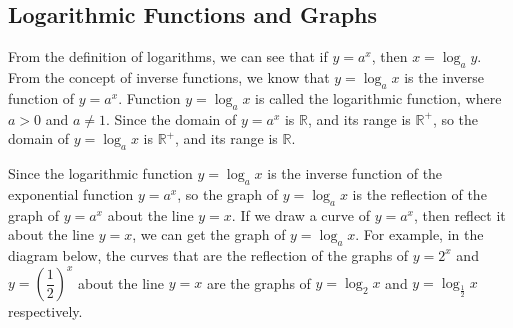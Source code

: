 \documentclass[12pt]{report}
\begin{document}
\subsection*{Logarithmic Functions and Graphs}

From the definition of logarithms, we can see that if $y = a^x$, then $x =
    \log_a y$. From the concept of inverse functions, we know that $y = \log_a x$
is the inverse function of $y = a^x$. Function $y = \log_a x$ is called the
logarithmic function, where $a > 0$ and $a \neq 1$. Since the domain of $y =
    a^x$ is $\mathbb{R}$, and its range is $\mathbb{R}^+$, so the domain of $y =
    \log_a x$ is $\mathbb{R}^+$, and its range is $\mathbb{R}$.

Since the logarithmic function $y = \log_a x$ is the inverse function of the
exponential function $y = a^x$, so the graph of $y = \log_a x$ is the
reflection of the graph of $y = a^x$ about the line $y = x$. If we draw a curve
of $y = a^x$, then reflect it about the line $y = x$, we can get the graph of
$y = \log_a x$. For example, in the diagram below, the curves that are the
reflection of the graphs of $y = 2^x$ and $y = {\left(\dfrac{1}{2}\right)}^x$
about the line $y = x$ are the graphs of $y = \log_2 x$ and $y =
    \log_\frac{1}{2} x$ respectively.
\end{document}
